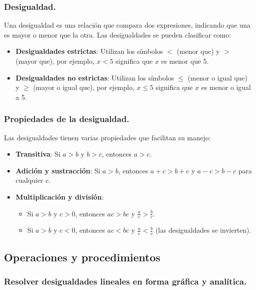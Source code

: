 \subsubsection{Desigualdad.}

Una desigualdad es una relación que compara dos expresiones, indicando que una es mayor o menor que la otra. Las desigualdades se pueden clasificar como:

\begin{itemize}
    \item \textbf{Desigualdades estrictas}: Utilizan los símbolos \(<\) (menor que) y \(>\) (mayor que), por ejemplo, \(x < 5\) significa que \(x\) es menor que 5.
    \item \textbf{Desigualdades no estrictas}: Utilizan los símbolos \(\leq\) (menor o igual que) y \(\geq\) (mayor o igual que), por ejemplo, \(x \leq 5\) significa que \(x\) es menor o igual a 5.
\end{itemize}

\subsubsection{Propiedades de la desigualdad.}

Las desigualdades tienen varias propiedades que facilitan su manejo:

\begin{itemize}
    \item \textbf{Transitiva}: Si \(a > b\) y \(b > c\), entonces \(a > c\).
    \item \textbf{Adición y sustracción}: Si \(a > b\), entonces \(a + c > b + c\) y \(a - c > b - c\) para cualquier \(c\).
    \item \textbf{Multiplicación y división}: 
        \begin{itemize}
            \item Si \(a > b\) y \(c > 0\), entonces \(ac > bc\) y \(\frac{a}{c} > \frac{b}{c}\).
            \item Si \(a > b\) y \(c < 0\), entonces \(ac < bc\) y \(\frac{a}{c} < \frac{b}{c}\) (las desigualdades se invierten).
        \end{itemize}
\end{itemize}

\subsection{Operaciones y procedimientos}

\subsubsection{Resolver desigualdades lineales en forma gráfica y analítica.}

